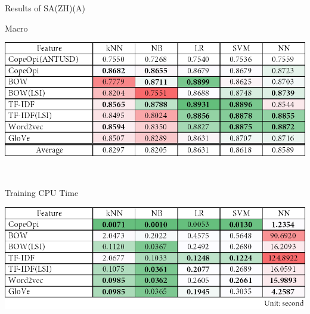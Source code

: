 \begin{table}[H]
\caption{Results of SA(ZH)(A)}
\label{tab:sa_zh_a}
\centering
\begin{subtable}{\textwidth}
	\centering
	\caption{Macro \fscore{}}
	\includegraphics[width=\resultfigwidth]{chapters/ch4/table/sa/SA(ZH)(A).png}
\end{subtable}
\\[\tblskip]
\begin{subtable}{\textwidth}
	\centering
	\caption{Training CPU Time}
	\includegraphics[width=\resultfigwidth]{chapters/ch4/table/sa/SA(ZH)(A)T.png}
\end{subtable}
\end{table}